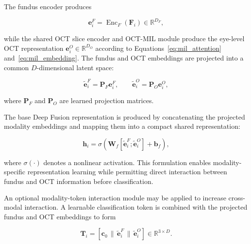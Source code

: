 \documentclass[preprint,12pt]{elsarticle}
\begin{document}
The fundus encoder produces

\begin{equation}
    \mathbf{e}_{i}^{F}
    =
    \operatorname{Enc}_{F}\!\left(\mathbf{F}_{i}\right)
    \in \mathbb{R}^{D_F},
    \label{eq:fundus_encoder}
\end{equation}

while the shared OCT slice encoder and OCT-MIL module produce the eye-level OCT representation $\mathbf{e}_{i}^{O}\in\mathbb{R}^{D_O}$ according to Equations~\eqref{eq:mil_attention} and~\eqref{eq:mil_embedding}. The fundus and OCT embeddings are projected into a common $D$-dimensional latent space:

\begin{equation}
    \tilde{\mathbf{e}}_{i}^{F}
    =
    \mathbf{P}_{F}\mathbf{e}_{i}^{F},
    \qquad
    \tilde{\mathbf{e}}_{i}^{O}
    =
    \mathbf{P}_{O}\mathbf{e}_{i}^{O},
    \label{eq:deep_projection}
\end{equation}

where $\mathbf{P}_{F}$ and $\mathbf{P}_{O}$ are learned projection matrices.

The base Deep Fusion representation is produced by concatenating the projected modality embeddings and mapping them into a compact shared representation:

\begin{equation}
    \mathbf{h}_{i}
    =
    \sigma\!\left(
    \mathbf{W}_{f}
    \left[
        \tilde{\mathbf{e}}_{i}^{F};
        \tilde{\mathbf{e}}_{i}^{O}
        \right]
    +
    \mathbf{b}_{f}
    \right),
    \label{eq:deep_concat}
\end{equation}

where $\sigma(\cdot)$ denotes a nonlinear activation. This formulation enables modality-specific representation learning while permitting direct interaction between fundus and OCT information before classification.

An optional modality-token interaction module may be applied to increase cross-modal interaction. A learnable classification token is combined with the projected fundus and OCT embeddings to form

\begin{equation}
    \mathbf{T}_{i}
    =
    \left[
        \mathbf{c}_{0}
        \,\|\,
        \tilde{\mathbf{e}}_{i}^{F}
        \,\|\,
        \tilde{\mathbf{e}}_{i}^{O}
        \right]
    \in\mathbb{R}^{3\times D}.
    \label{eq:deep_tokens}
\end{equation}
\end{document}

